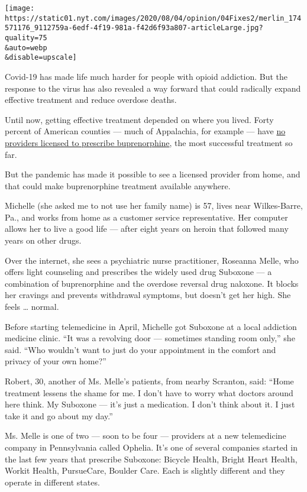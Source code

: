 \texttt{[image: https://static01.nyt.com/images/2020/08/04/opinion/04Fixes2/merlin\_174571176\_9112759a-6edf-4f19-981a-f42d6f93a807-articleLarge.jpg?quality=75\\\&auto=webp\\\&disable=upscale]}

Covid-19 has made life much harder for people with opioid addiction. But
the response to the virus has also revealed a way forward that could
radically expand effective treatment and reduce overdose deaths.

Until now, getting effective treatment depended on where you lived.
Forty percent of American counties --- much of Appalachia, for example
--- have \href{https://oig.hhs.gov/oei/reports/oei-12-17-00240.asp}{no
providers licensed to prescribe buprenorphine}, the most successful
treatment so far.

But the pandemic has made it possible to see a licensed provider from
home, and that could make buprenorphine treatment available anywhere.

Michelle (she asked me to not use her family name) is 57, lives near
Wilkes-Barre, Pa., and works from home as a customer service
representative. Her computer allows her to live a good life --- after
eight years on heroin that followed many years on other drugs.

Over the internet, she sees a psychiatric nurse practitioner, Roseanna
Melle, who offers light counseling and prescribes the widely used drug
Suboxone --- a combination of buprenorphine and the overdose reversal
drug naloxone. It blocks her cravings and prevents withdrawal symptoms,
but doesn't get her high. She feels \ldots{} normal.

Before starting telemedicine in April, Michelle got Suboxone at a local
addiction medicine clinic. ``It was a revolving door --- sometimes
standing room only,'' she said. ``Who wouldn't want to just do your
appointment in the comfort and privacy of your own home?''

Robert, 30, another of Ms. Melle's patients, from nearby Scranton, said:
``Home treatment lessens the shame for me. I don't have to worry what
doctors around here think. My Suboxone --- it's just a medication. I
don't think about it. I just take it and go about my day.''

Ms. Melle is one of two --- soon to be four --- providers at a new
telemedicine company in Pennsylvania called Ophelia. It's one of several
companies started in the last few years that prescribe Suboxone: Bicycle
Health, Bright Heart Health, Workit Health, PursueCare, Boulder Care.
Each is slightly different and they operate in different states.

